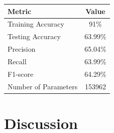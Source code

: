 \documentclass[12pt,a4paper]{article}
\begin{document}
\begin{center}
\begin{tabular}{|l|c|}
\hline
\textbf{Metric} & \textbf{Value} \\
\hline
Training Accuracy & 91\% \\
\hline
Testing Accuracy & 63.99\% \\
\hline
Precision & 65.04\% \\
\hline
Recall & 63.99\% \\
\hline
F1-score & 64.29\% \\
\hline
Number of Parameters & 153962 \\
\hline
\end{tabular}
\end{center}

\section{Discussion}
\end{document}

